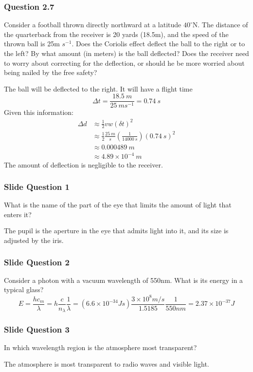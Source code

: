 \documentclass{math}
\begin{document}
\subsubsection*{Question 2.7}
Consider a football thrown directly northward at a latitude \( 40^{\circ} \)N.
The distance of the quarterback from the receiver is 20 yards (18.5m), and the
speed of the thrown ball is 25m \( s^{-1} \). Does the Coriolis effect deflect
the ball to the right or to the left? By what amount (in meters) is the ball
deflected? Does the receiver need to worry about correcting for the deflection,
or should he be more worried about being nailed by the free safety? \par
The ball will be deflected to the right. It will have a flight time
\[ \Delta t = \frac{18.5~m}{25~ms^{-1}} = 0.74~s \]
Given this information:
\begin{align*}
  \Delta d &\approx \frac{1}{2}vw(\delta t)^2 \\
  &\approx \frac{1}{2}\frac{25~m}{s}(\frac{1}{14000~s})(0.74~s)^2 \\
  &\approx 0.000489~m \\
  &\approx 4.89\times10^{-4}~m
\end{align*}
The amount of deflection is negligible to the receiver.

\subsubsection*{Slide Question 1}
What is the name of the part of the eye that limits the amount of light that
enters it? \par
The pupil is the aperture in the eye that admits light into it, and its size
is adjusted by the iris.

\subsubsection*{Slide Question 2}
Consider a photon with a vacuum wavelength of 550nm. What is its energy in a
typical glass?
\[ E = \frac{hc_m}{\lambda} = h\frac{c}{n_{\lambda}}\frac{1}{\lambda} =
  (6.6\times10^{-34}Js)\frac{3\times10^8m/s}{1.5185}\frac{1}{550nm} =
  2.37\times10^{-37}J \]

\subsubsection*{Slide Question 3}
In which wavelength region is the atmosphere most transparent? \par
The atmosphere is most transparent to radio waves and visible light.
\end{document}
